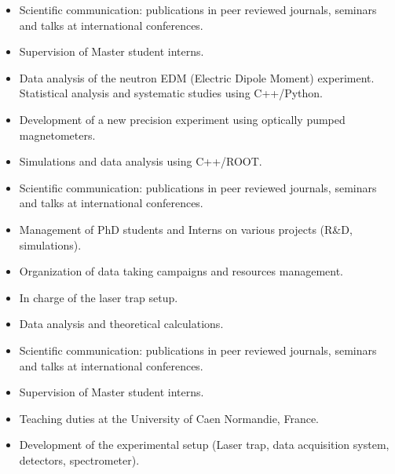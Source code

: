 \documentclass[10pt,a4paper,ragged2e]{altacv}
\begin{document}
\divider

\begin{itemize}
\item Scientific communication: publications in peer reviewed journals, seminars and talks at international conferences.
\item Supervision of Master student interns.
\item Data analysis of the neutron EDM (Electric Dipole Moment) experiment. Statistical analysis and systematic studies using C++/Python.
\item Development of a new precision experiment using optically pumped magnetometers.
\end{itemize}

\divider

\begin{itemize}
\item Simulations and data analysis using C++/ROOT.
\item Scientific communication: publications in peer reviewed journals, seminars and talks at international conferences.
\item Management of PhD students and Interns on various projects (R\&D, simulations).
\item Organization of data taking campaigns and resources management.
\item In charge of the laser trap setup.
\end{itemize}

\divider

\begin{itemize}
\item Data analysis and theoretical calculations.
\item Scientific communication: publications in peer reviewed journals, seminars and talks at international conferences.
\item Supervision of Master student interns.
\item Teaching duties at the University of Caen Normandie, France.
\item Development of the experimental setup (Laser trap, data acquisition system, detectors, spectrometer).
\end{itemize}
\end{document}
